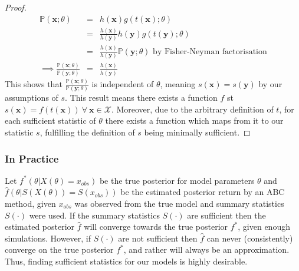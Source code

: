 \documentclass[11pt,a4paper,margin=0]{article}
\newcommand*{\prob}{\mathbb{P}}
\theoremstyle{break}
\begin{document}
\begin{box_theorem}
\begin{proof}
      \[\begin{array}{rcl}
        \prob(\mathbf{x};\theta)&=&h(\mathbf{x})g(t(\mathbf{x});\theta)\\
        &=&\frac{h(\mathbf{x})}{h(\mathbf{y})}h(\mathbf{y})g(t(\mathbf{y});\theta)\\
        &=&\frac{h(\mathbf{x})}{h(\mathbf{y})}\prob(\mathbf{y};\theta)\text{ by Fisher-Neyman factorisation}\\
        \implies\frac{\prob(\mathbf{x};\theta)}{\prob(\mathbf{y};\theta)}&=&\frac{h(\mathbf{x})}{h(\mathbf{y})}
      \end{array}\]
      This shows that $\frac{\prob(\mathbf{x};\theta)}{\prob(\mathbf{y};\theta)}$ is independent of $\theta$, meaning $s(\mathbf{x})=s(\mathbf{y})$ by our assumptions of $s$. This result means there exists a function $f$ st $s(\mathbf{x})=f(t(\mathbf{x}))\ \forall\ \mathbf{x}\in\mathcal{X}$. Moreover, due to the arbitrary definition of $t$, for each sufficient statistic of $\theta$ there exists a function which maps from it to our statistic $s$, fulfilling the definition of $s$ being minimally sufficient.
    \end{proof}
  \end{box_theorem}



\subsubsection*{In Practice}
  \par Let $f^*(\theta|X(\theta)=x_{obs})$ be the true posterior for model parameters $\theta$ and $\hat{f}(\theta|S(X(\theta))=S(x_{obs}))$ be the estimated posterior return by an ABC method, given $x_{obs}$ was observed from the true model and summary statistics $S(\cdot)$ were used. If the summary statistics $S(\cdot)$ are sufficient then the estimated posterior $\hat{f}$ will converge towards the true posterior $f^*$, given enough simulations. However, if $S(\cdot)$ are not sufficient then $\hat{f}$ can never (consistently) converge on the true posterior $f^*$, and rather will always be an approximation. Thus, finding sufficient statistics for our models is highly desirable.
\end{document}
